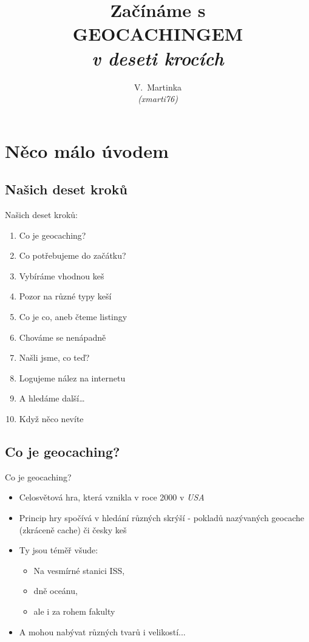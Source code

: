 \documentclass{beamer}
\title[\textbf{ZAČÍNÁME S GEOCACHINGEM}]{\huge \textbf{Začínáme s\\GEOCACHINGEM}\\\emph{v deseti krocích}}
\author{V.~Martinka\\ \emph{(xmarti76)}}
\institute{\textsc{Vysoké učení technické v~Brně\\Fakulta informačních technologií}}
\begin{document}
	
	\begin{frame}
		\titlepage
	\end{frame}
	
	\section{Něco málo úvodem}
	\subsection{Našich deset kroků}
	\begin{frame}{Našich deset kroků:}
		\begin{enumerate}
			\item Co je geocaching?
			\item Co potřebujeme do začátku?
			\item Vybíráme vhodnou keš
			\item Pozor na různé typy keší
			\item Co je co, aneb čteme listingy
			\item Chováme se nenápadně
			\item Našli jsme, co teď?
			\item Logujeme nález na internetu
			\item A hledáme další\dots
			\item Když něco nevíte
		\end{enumerate}
	\end{frame}
	

	\subsection{Co je geocaching?}
	\begin{frame}{Co je geocaching?}
		\begin{itemize}
			\item Celosvětová hra, která vznikla v roce 2000 v \emph{USA}
			\item Princip hry spočívá v hledání různých skrýší - pokladů nazývaných geocache (zkráceně cache) či česky keš
			\item Ty jsou téměř všude:
				\begin{itemize}
					\item Na vesmírné stanici ISS,
					\item dně oceánu,
					\item ale i za rohem fakulty
				\end{itemize}
			\item A mohou nabývat různých tvarů i velikostí...
		\end{itemize}
	\end{frame}
\end{document}
